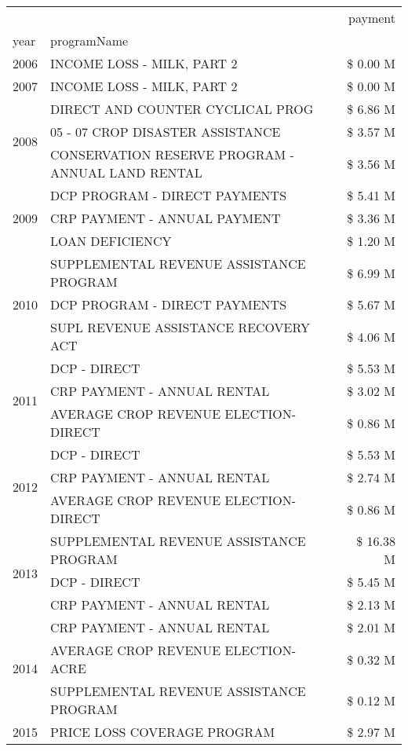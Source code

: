 \begin{tabular}{llr}
\toprule
 &  & payment \\
year & programName &  \\
\midrule
2006 & INCOME LOSS - MILK, PART 2 & \$ 0.00 M \\
\cline{1-3}
2007 & INCOME LOSS - MILK, PART 2 & \$ 0.00 M \\
\cline{1-3}
\multirow[t]{3}{*}{2008} & DIRECT AND COUNTER CYCLICAL PROG & \$ 6.86 M \\
 & 05 - 07 CROP DISASTER ASSISTANCE & \$ 3.57 M \\
 & CONSERVATION RESERVE PROGRAM - ANNUAL LAND RENTAL & \$ 3.56 M \\
\cline{1-3}
\multirow[t]{3}{*}{2009} & DCP PROGRAM - DIRECT PAYMENTS & \$ 5.41 M \\
 & CRP PAYMENT - ANNUAL PAYMENT & \$ 3.36 M \\
 & LOAN DEFICIENCY & \$ 1.20 M \\
\cline{1-3}
\multirow[t]{3}{*}{2010} & SUPPLEMENTAL REVENUE ASSISTANCE PROGRAM & \$ 6.99 M \\
 & DCP PROGRAM - DIRECT PAYMENTS & \$ 5.67 M \\
 & SUPL REVENUE ASSISTANCE RECOVERY ACT & \$ 4.06 M \\
\cline{1-3}
\multirow[t]{3}{*}{2011} & DCP - DIRECT & \$ 5.53 M \\
 & CRP PAYMENT - ANNUAL RENTAL & \$ 3.02 M \\
 & AVERAGE CROP REVENUE ELECTION-DIRECT & \$ 0.86 M \\
\cline{1-3}
\multirow[t]{3}{*}{2012} & DCP - DIRECT & \$ 5.53 M \\
 & CRP PAYMENT - ANNUAL RENTAL & \$ 2.74 M \\
 & AVERAGE CROP REVENUE ELECTION-DIRECT & \$ 0.86 M \\
\cline{1-3}
\multirow[t]{3}{*}{2013} & SUPPLEMENTAL REVENUE ASSISTANCE PROGRAM & \$ 16.38 M \\
 & DCP - DIRECT & \$ 5.45 M \\
 & CRP PAYMENT - ANNUAL RENTAL & \$ 2.13 M \\
\cline{1-3}
\multirow[t]{3}{*}{2014} & CRP PAYMENT - ANNUAL RENTAL & \$ 2.01 M \\
 & AVERAGE CROP REVENUE ELECTION-ACRE & \$ 0.32 M \\
 & SUPPLEMENTAL REVENUE ASSISTANCE PROGRAM & \$ 0.12 M \\
\cline{1-3}
\multirow[t]{3}{*}{2015} & PRICE LOSS COVERAGE PROGRAM & \$ 2.97 M \\

\end{tabular}
